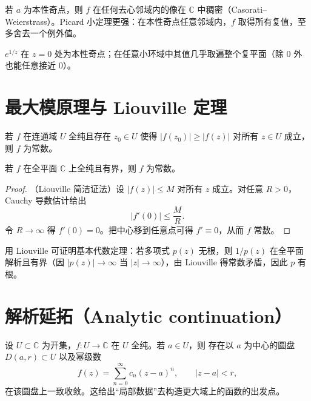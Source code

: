 \documentclass[lang=cn,10pt]{elegantbook}
\begin{document}
	\begin{definition}
		若 \(a\) 为本性奇点，则 \(f\) 在任何去心邻域内的像在 \(\mathbb C\) 中稠密（Casorati--Weierstrass）。Picard 小定理更强：在本性奇点任意邻域内，\(f\) 取得所有复值，至多舍去一个例外值。
	\end{definition}
	
	\begin{example}
		\(e^{1/z}\) 在 \(z=0\) 处为本性奇点；在任意小环域中其值几乎取遍整个复平面（除 0 外也能任意接近 0）。
	\end{example}
	
	\section{最大模原理与 Liouville 定理}
	
	\begin{definition}[最大模原理]
		若 \(f\) 在连通域 \(U\) 全纯且存在 \(z_0\in U\) 使得 \(|f(z_0)|\ge |f(z)|\) 对所有 \(z\in U\) 成立，则 \(f\) 为常数。
	\end{definition}
	
	\begin{definition}[Liouville 定理]
		若 \(f\) 在全平面 \(\mathbb C\) 上全纯且有界，则 \(f\) 为常数。
	\end{definition}
	
	\begin{proof}
		（Liouville 简洁证法）设 \(|f(z)|\le M\) 对所有 \(z\) 成立。对任意 \(R>0\)，Cauchy 导数估计给出
		\[
		|f'(0)|\le \frac{M}{R}.
		\]
		令 \(R\to\infty\) 得 \(f'(0)=0\)。把中心移到任意点可得 \(f'\equiv0\)，从而 \(f\) 常数。
	\end{proof}
	
	\begin{example}
		用 Liouville 可证明基本代数定理：若多项式 \(p(z)\) 无根，则 \(1/p(z)\) 在全平面解析且有界（因 \(|p(z)|\to\infty\) 当 \(|z|\to\infty\)），由 Liouville 得常数矛盾，因此 \(p\) 有根。
	\end{example}
	
	\section{解析延拓（Analytic continuation）}
	
	\begin{theorem}[局部定义与全纯性的回顾]
		设 \(U\subset\mathbb C\) 为开集，\(f:U\to\mathbb C\) 在 \(U\) 全纯。若 \(a\in U\)，则
		存在以 \(a\) 为中心的圆盘 \(D(a,r)\subset U\) 以及幂级数
		\[
		f(z)=\sum_{n=0}^\infty c_n (z-a)^n,\qquad |z-a|<r,
		\]
		在该圆盘上一致收敛。这给出“局部数据”去构造更大域上的函数的出发点。
	\end{theorem}
	
\end{document}
